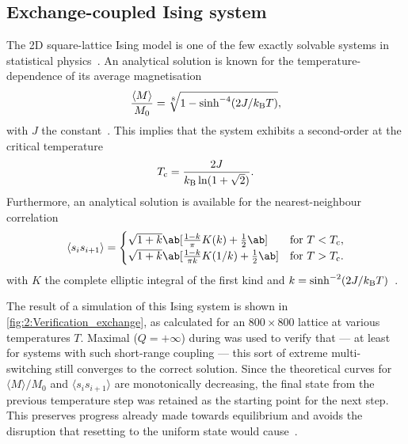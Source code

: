 \subsection{Exchange-coupled Ising system}
\label{sec:2:Verification_OOP_Exchange}
The 2D square-lattice  Ising model is one of the few exactly solvable systems in statistical physics~\cite{ExactlySolvedModelsStatMech}.
An analytical solution is known for the temperature-dependence of its average magnetisation
\begin{equation}
	\label{eq:2:Verification_exchange_M}
	\frac{\langle M \rangle}{M_0} = \sqrt[8]{1 - \sinh^{-4}(2J/\kBT)} \mathrm{,}
\end{equation}
with $J$ the  constant~\cite{Correlations2DIsing,IsingSpontaneousMagnetization,coey2010magnetism}.
This implies that the system exhibits a second-order  at the critical temperature~\cite{ExactlySolvedModelsStatMech}
\begin{equation}
	T_\mathrm{c} = \frac{2J}{\kB \ln(1 + \sqrt{2})} \mathrm{.}
\end{equation}
Furthermore, an analytical solution is available for the nearest-neighbour correlation
\begin{equation}
	\label{eq:2:Verification_exchange_corr}
	\langle s_i s_{i+1} \rangle = 
	\begin{cases}
		\sqrt{1+k} \ab[\frac{1-k}{\pi}K(k) + \frac{1}{2} \ab] &\text{for } T < T_\mathrm{c} \mathrm{,} \\ 
		\sqrt{1+k} \ab[\frac{1-k}{\pi k}K(1/k) + \frac{1}{2} \ab] &\text{for } T > T_\mathrm{c} \mathrm{.} \\ 
	\end{cases}
\end{equation}
with $K$ the complete elliptic integral of the first kind and $k=\sinh^{-2}(2J/\kBT)$~\cite{Correlations2DIsing}. \\\par

The result of a \hotspice simulation of this Ising system is shown in \cref{fig:2:Verification_exchange}, as calculated for an $800 \times 800$ lattice at various temperatures $T$.
Maximal  ($Q=+\infty$) during  was used to verify that --- at least for systems with such short-range coupling --- this sort of extreme multi-switching still converges to the correct solution.
Since the theoretical curves for $\langle M \rangle / M_0$ and $\langle s_i s_{i+1} \rangle$ are monotonically decreasing, the final state from the previous temperature step was retained as the starting point for the next step.
This preserves progress already made towards equilibrium and avoids the disruption that resetting to the uniform state would cause~\cite{MCinStatPhys}. \par

